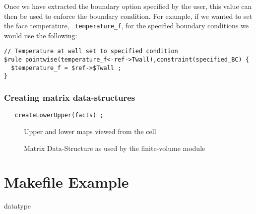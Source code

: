 \documentclass[10pt,epsf]{book}
\begin{document}
Once we have extracted the boundary option specified by the user, this
value can then be used to enforce the boundary condition.  For
example, if we wanted to set the face temperature, {\tt
  temperature\_f}, for the specified boundary conditions we would use
the following:
\begin{verbatim}
// Temperature at wall set to specified condition
$rule pointwise(temperature_f<-ref->Twall),constraint(specified_BC) {
  $temperature_f = $ref->$Twall ;
}
\end{verbatim}

\subsection{ Creating matrix data-structures}
\begin{verbatim}
   createLowerUpper(facts) ;
\end{verbatim}

\begin{figure}[htbp]
 \centerline{
  \epsfxsize=3.5in
  }
 \caption{Upper and lower maps viewed from the cell}

\end{figure}

\begin{figure}[htbp]
 \centerline{
  \epsfxsize=5in
  }
 \caption{Matrix Data-Structure as used by the finite-volume module}

\end{figure}

\appendix

\chapter { Makefile Example}
\label{chap:makefile}



 {datatype}


%
\end{document}

